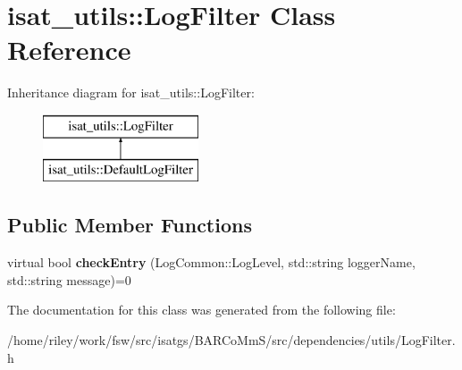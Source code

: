 \hypertarget{classisat__utils_1_1_log_filter}{}\section{isat\+\_\+utils\+:\+:Log\+Filter Class Reference}
\label{classisat__utils_1_1_log_filter}
Inheritance diagram for isat\+\_\+utils\+:\+:Log\+Filter\+:\begin{figure}[H]
\begin{center}
\leavevmode
\includegraphics[height=2.000000cm]{classisat__utils_1_1_log_filter}
\end{center}
\end{figure}
\subsection*{Public Member Functions}
\begin{DoxyCompactItemize}
\item 
virtual bool {\bfseries check\+Entry} (Log\+Common\+::\+Log\+Level, std\+::string logger\+Name, std\+::string message)=0\hypertarget{classisat__utils_1_1_log_filter_a311a404daf5b6225f70352c06db02d2e}{}\label{classisat__utils_1_1_log_filter_a311a404daf5b6225f70352c06db02d2e}

\end{DoxyCompactItemize}


The documentation for this class was generated from the following file\+:\begin{DoxyCompactItemize}
\item 
/home/riley/work/fsw/src/isatgs/\+B\+A\+R\+Co\+Mm\+S/src/dependencies/utils/Log\+Filter.\+h\end{DoxyCompactItemize}
